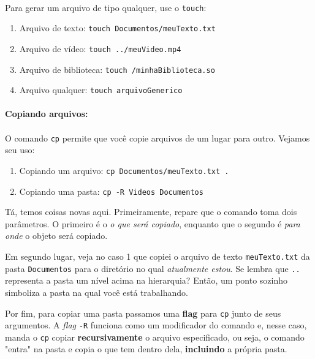 \documentclass{article}
\begin{document}
	\paragraph{}
	Para gerar um arquivo de tipo qualquer, use o \texttt{touch}: 
	
	\begin{enumerate} 
		\item{Arquivo de texto: \texttt{touch Documentos/meuTexto.txt}} 
		\item{Arquivo de vídeo: \texttt{touch ../meuVideo.mp4}}
		\item{Arquivo de biblioteca: \texttt{touch /minhaBiblioteca.so}}
		\item{Arquivo qualquer: \texttt{touch arquivoGenerico}}
	\end{enumerate}

	\paragraph{Copiando arquivos:} 
	\paragraph{} 
	O comando \texttt{cp} permite que você copie arquivos de um lugar para outro. Vejamos seu uso: 
	\begin{enumerate} 
		\item{Copiando um arquivo: \texttt{cp Documentos/meuTexto.txt .}}
		\item{Copiando uma pasta: \texttt{cp -R Videos Documentos}}
	\end{enumerate} 


	Tá, temos coisas novas aqui. Primeiramente, repare que o comando toma dois parâmetros. O primeiro é 
	o \textit{o que será copiado}, enquanto que o segundo é \textit{para onde} o objeto será copiado. 
	
	Em segundo lugar, veja no caso 1 que copiei o arquivo de texto \texttt{meuTexto.txt} da pasta \texttt{Documentos} 
	para o diretório no qual \textit{atualmente estou}. Se lembra que \texttt{..} representa a pasta um nível acima
	na hierarquia? Então, um ponto sozinho simboliza a pasta na qual você está trabalhando. 
	
	Por fim, para copiar uma pasta passamos uma \textbf{flag} para \texttt{cp} junto de seus argumentos. 
	A \textit{flag} \texttt{-R} funciona como um modificador do comando e, nesse caso, manda o \texttt{cp}
	copiar \textbf{recursivamente} o arquivo especificado, ou seja, o comando "entra" na pasta e copia o que
	tem dentro dela, \textbf{incluindo} a própria pasta. 
\end{document}
